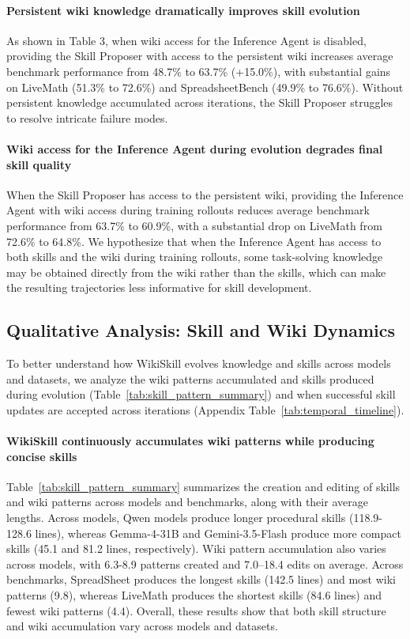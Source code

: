 \documentclass[11pt, a4paper, copyright, gr]{google}
\newcommand{\method}{WikiSkill\xspace}
\begin{document}
\paragraph{Persistent wiki knowledge dramatically improves skill evolution} 
As shown in Table 3, when wiki access for the Inference Agent is disabled, providing the Skill Proposer with access to the persistent wiki increases average benchmark performance from 48.7\% to 63.7\% (+15.0\%), with substantial gains on LiveMath (51.3\% to 72.6\%) and SpreadsheetBench (49.9\% to 76.6\%). Without persistent knowledge accumulated across iterations, the Skill Proposer struggles to resolve intricate failure modes.

\paragraph{Wiki access for the Inference Agent during evolution degrades final skill quality} 
When the Skill Proposer has access to the persistent wiki, providing the Inference Agent with wiki access during training rollouts reduces average benchmark performance from 63.7\% to 60.9\%, with a substantial drop on LiveMath from 72.6\% to 64.8\%. We hypothesize that when the Inference Agent has access to both skills and the wiki during training rollouts, some task-solving knowledge may be obtained directly from the wiki rather than the skills, which can make the resulting trajectories less informative for skill development.


\subsection{Qualitative Analysis: Skill and Wiki Dynamics}
\label{subsec:qualitative_analysis}

To better understand how \method evolves knowledge and skills across models and datasets, we analyze the wiki patterns accumulated and skills produced during evolution (Table~\ref{tab:skill_pattern_summary}) and when successful skill updates are accepted across iterations (Appendix Table~\ref{tab:temporal_timeline}).

\paragraph{WikiSkill continuously accumulates wiki patterns while producing concise skills} 
Table~\ref{tab:skill_pattern_summary} summarizes the creation and editing of skills and wiki patterns across models and benchmarks, along with their average lengths. Across models, Qwen models produce longer procedural skills (118.9-128.6 lines), whereas Gemma-4-31B and Gemini-3.5-Flash produce more compact skills (45.1 and 81.2 lines, respectively). Wiki pattern accumulation also varies across models, with 6.3-8.9 patterns created and 7.0–18.4 edits on average. Across benchmarks, SpreadSheet produces the longest skills (142.5 lines) and most wiki patterns (9.8), whereas LiveMath produces the shortest skills (84.6 lines) and fewest wiki patterns (4.4). Overall, these results show that both skill structure and wiki accumulation vary across models and datasets.
\end{document}
